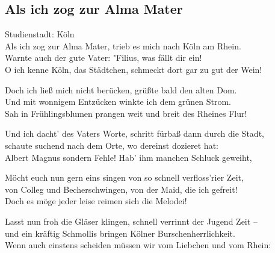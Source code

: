 
\subsection*{Als ich zog zur Alma Mater}
%
%
%
\nopagebreak
\hfill%
Studienstadt: Köln\\
%
\nopagebreak
\thestrophe Als ich zog zur Alma Mater, trieb es mich nach Köln am Rhein. \\
Warnte auch der gute Vater: "Filius, was fällt dir ein! \\
O ich kenne Köln, das Städtchen, schmeckt dort gar zu gut der Wein! \\

\thestrophe Doch ich ließ mich nicht berücken, grüßte bald den alten Dom. \\
Und mit wonnigem Entzücken winkte ich dem grünen Strom. \\
Sah in Frühlingsblumen prangen weit und breit des Rheines Flur! \\

\thestrophe Und ich dacht' des Vaters Worte, schritt fürbaß dann durch die Stadt, \\
schaute suchend nach dem Orte, wo dereinst dozieret hat: \\
Albert Magnus sondern Fehle! Hab' ihm manchen Schluck geweiht, \\

\thestrophe Möcht euch nun gern eins singen von so schnell verfloss'rier Zeit, \\
von Colleg und Becherschwingen, von der Maid, die ich gefreit! \\
Doch es möge jeder leise reimen sich die Melodei! \\

\thestrophe Lasst nun froh die Gläser klingen, schnell verrinnt der Jugend Zeit – \\
und ein kräftig Schmollis bringen Kölner Burschenherrlichkeit.\\
Wenn auch einstens scheiden müssen wir vom Liebchen und vom Rhein: \\

